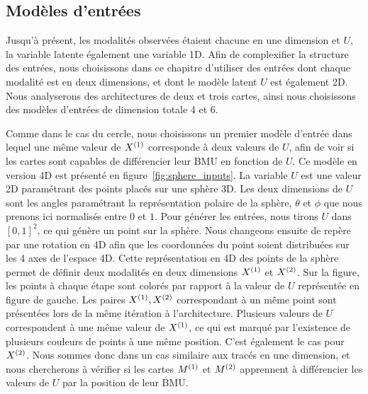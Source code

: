 \documentclass[../main]{subfiles}
\begin{document}

\subsection{Modèles d'entrées}

Jusqu'à présent, les modalités observées étaient chacune en une dimension et $U$, la variable latente également une variable 1D.
Afin de complexifier la structure des entrées, nous choisissons dans ce chapitre d'utiliser des entrées dont chaque modalité est en deux dimensions, et dont le modèle latent $U$ est également 2D.
Nous analyserons des architectures de deux et trois cartes, ainsi nous choisissons des modèles d'entrées de dimension totale 4 et 6.

Comme dans le cas du cercle, nous choisissons un premier modèle d'entrée dans lequel une même valeur de $X^{({1})}$ corresponde à deux valeurs de $U$, afin de voir si les cartes sont capables de différencier leur BMU en fonction de $U$.
Ce modèle en version 4D est présenté en figure~\ref{fig:sphere_inputs}. La variable $U$ est une valeur 2D paramétrant des points placés sur une sphère 3D. 
Les deux dimensions de $U$ sont les angles paramétrant la représentation polaire de la sphère, $\theta$ et $\phi$ que nous prenons ici normalisés entre $0$ et $1$.
Pour générer les entrées, nous tirons $U$ dans $[0,1]^2$, ce qui génère un point sur la sphère.
Nous changeons ensuite de repère par une rotation en 4D afin que les coordonnées du point soient distribuées sur les 4 axes de l'espace 4D.
Cette représentation en 4D des points de la sphère permet de définir deux modalités en deux dimensions $X^{({1})}$ et $X^{({2})}$. Sur la figure, les points à chaque étape sont colorés par rapport à la valeur de $U$ représentée en figure de gauche.
Les paires $X^{({1})}, X^{({2})}$ correspondant à un même point sont présentées lors de la même itération à l'architecture.
Plusieurs valeurs de $U$ correspondent à une même valeur de $X^{({1})}$, ce qui est marqué par l'existence de plusieurs couleurs de points à une même position. C'est également le cas pour $X^{({2})}$.
Nous sommes donc dans un cas similaire aux tracés en une dimension, et nous chercherons à vérifier si les cartes $M^{({1})}$ et $M^{({2})}$ apprennent à différencier les valeurs de $U$ par la position de leur BMU.
\end{document}
